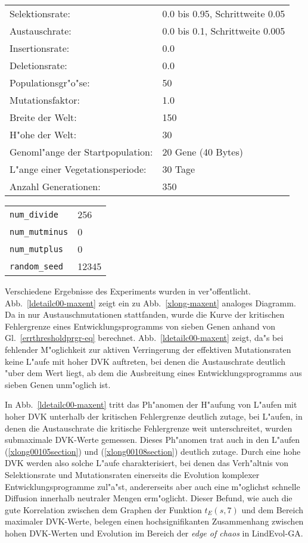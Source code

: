 \medskip
\begin{tabular}{ll}
Selektionsrate: & 0.0 bis 0.95, Schrittweite 0.05 \\
Austauschrate: & 0.0 bis 0.1, Schrittweite 0.005 \\
Insertionsrate: & 0.0 \\
Deletionsrate: & 0.0 \\
Populationsgr"o"se: & 50 \\
Mutationsfaktor: & 1.0 \\
Breite der Welt: & 150 \\
H"ohe der Welt: & 30  \\
Genoml"ange der Startpopulation: & 20 Gene (40 Bytes) \\
L"ange einer Vegetationsperiode: & 30 Tage \\
Anzahl Generationen:             & 350 \\
\end{tabular}

\begin{tabular}{ll}
\verb|num_divide| & 256 \\
\verb|num_mutminus| & 0 \\
\verb|num_mutplus| & 0 \\
\verb|random_seed| & 12345 \\
\end{tabular}
\medskip

Verschiedene Ergebnisse des Experiments  wurden in \cite{Kim95} ver"offentlicht.
Abb.\ \ref{ldetailc00-maxent} zeigt ein zu Abb.\ \ref{xlong-maxent} analoges Diagramm. Da in 
nur Austauschmutationen stattfanden, wurde die Kurve der kritischen Fehlergrenze eines Entwicklungsprogramms
von sieben Genen anhand von Gl.\ \ref{errthresholdprgr-eq} berechnet. Abb.\ \ref{ldetailc00-maxent} zeigt,
da"s bei fehlender M"oglichkeit zur aktiven Verringerung der effektiven Mutationsraten keine L"aufe mit hoher
DVK auftreten, bei denen die Austauschrate deutlich "uber dem Wert liegt, ab dem die Ausbreitung eines Entwicklungsprogramms
aus sieben Genen unm"oglich ist.

In Abb.\ \ref{ldetailc00-maxent} tritt das Ph"anomen der H"aufung von L"aufen mit hoher DVK unterhalb der 
kritischen Fehlergrenze deutlich zutage, bei L"aufen, in denen die Austauschrate die kritische Fehlergrenze
weit unterschreitet, wurden submaximale DVK-Werte gemessen. Dieses Ph"anomen trat auch in den L"aufen 
(\ref{xlong00105section}) und  (\ref{xlong00108section}) deutlich zutage.
Durch eine hohe DVK werden also solche L"aufe
charakterisiert, bei denen das Verh"altnis von Selektionsrate und Mutationsraten einerseits die Evolution
komplexer Entwicklungsprogramme zul"a"st, andererseits aber auch eine m"oglichst schnelle Diffusion innerhalb
neutraler Mengen erm"oglicht. Dieser Befund, wie auch die gute Korrelation zwischen dem Graphen der Funktion $t_E(s,7)$
und dem Bereich maximaler DVK-Werte, belegen einen hochsignifikanten Zusammenhang zwischen hohen DVK-Werten
und Evolution im Bereich der \textsl{edge of chaos} in LindEvol-GA.


